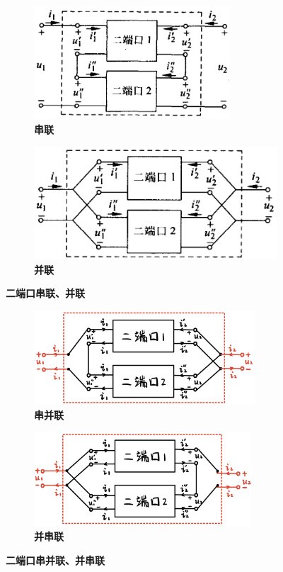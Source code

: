 \documentclass[UTF8]{report}
\theoremstyle{MyLineTheoremStyle} %
\theoremstyle{MyBlockTheoremStyle} %
\theoremstyle{MySubsubsectionStyle} %
\begin{document}
\begin{figure}[H]\centering
\begin{subfigure}[t]{0.46\textwidth}\centering
    \includegraphics[height=120pt]{assets/2/串联.png}
    \caption{\bfseries 串联 }
\end{subfigure}\begin{subfigure}[t]{0.54\textwidth}\centering
    \includegraphics[height=120pt]{assets/2/并联.png}
    \caption{\bfseries 并联 }
\end{subfigure}
\caption{\bfseries 二端口串联、并联 }
\end{figure}

\begin{figure}[H]\centering
\begin{subfigure}[t]{0.5\textwidth}\centering
    \includegraphics[height=100pt]{assets/2/串并联.png}
    \caption{\bfseries 串并联 }
\end{subfigure}\begin{subfigure}[t]{0.5\textwidth}\centering
    \includegraphics[height=100pt]{assets/2/并串联.png}
    \caption{\bfseries 并串联 }
\end{subfigure}
\caption{\bfseries 二端口串并联、并串联 }
\end{figure}
\end{document}
